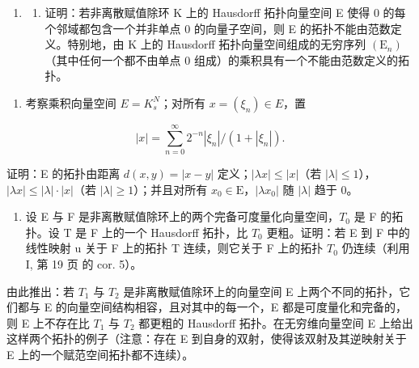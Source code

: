 \exercisegroup

\begin{enumerate}
\def\labelenumi{\arabic{enumi})}
\tightlist
\item
  \begin{enumerate}
  \def\labelenumii{\alph{enumii})}
  \tightlist
  \item
    证明：若非离散赋值除环 K 上的 Hausdorff 拓扑向量空间 E 使得 0 的每个邻域都包含一个并非单点 0 的向量子空间，则 E 的拓扑不能由范数定义。特别地，由 K 上的 Hausdorff 拓扑向量空间组成的无穷序列 \((\mathrm{E}_{n})\)（其中任何一个都不由单点 0 组成）的乘积具有一个不能由范数定义的拓扑。
  \end{enumerate}
\end{enumerate}

\begin{enumerate}
\def\labelenumi{\alph{enumi})}
\setcounter{enumi}{1}
\tightlist
\item
  考察乘积向量空间 \(E = K_{s}^{N}\)；对所有 \(x = (\xi_{n}) \in E\)，置
\end{enumerate}

\[
| x | = \sum_ {n = 0} ^ {\infty} 2 ^ {- n} \left| \xi_ {n} \right| / (1 + | \xi_ {n} |).
\]

证明：E 的拓扑由距离 \(d(x, y) = |x - y|\) 定义；\(|\lambda x| \leqslant |x|\)（若 \(|\lambda| \leqslant 1\)），\(|\lambda x| \leqslant |\lambda| \cdot |x|\)（若 \(|\lambda| \geqslant 1\)）；并且对所有 \(x_0 \in \mathrm{E}\)，\(|\lambda x_0|\) 随 \(|\lambda|\) 趋于 0。

\begin{enumerate}
\def\labelenumi{\arabic{enumi})}
\setcounter{enumi}{1}
\tightlist
\item
  设 E 与 F 是非离散赋值除环上的两个完备可度量化向量空间，\(T_{0}\) 是 F 的拓扑。设 T 是 F 上的一个 Hausdorff 拓扑，比 \(T_{0}\) 更粗。证明：若 E 到 F 中的线性映射 u 关于 F 上的拓扑 T 连续，则它关于 F 上的拓扑 \(T_{0}\) 仍连续（利用 I, 第 19 页 的 cor. 5）。
\end{enumerate}

由此推出：若 \(T_{1}\) 与 \(T_{2}\) 是非离散赋值除环上的向量空间 E 上两个不同的拓扑，它们都与 E 的向量空间结构相容，且对其中的每一个，E 都是可度量化和完备的，则 E 上不存在比 \(T_{1}\) 与 \(T_{2}\) 都更粗的 Hausdorff 拓扑。在无穷维向量空间 E 上给出这样两个拓扑的例子（注意：存在 E 到自身的双射，使得该双射及其逆映射关于 E 上的一个赋范空间拓扑都不连续）。

